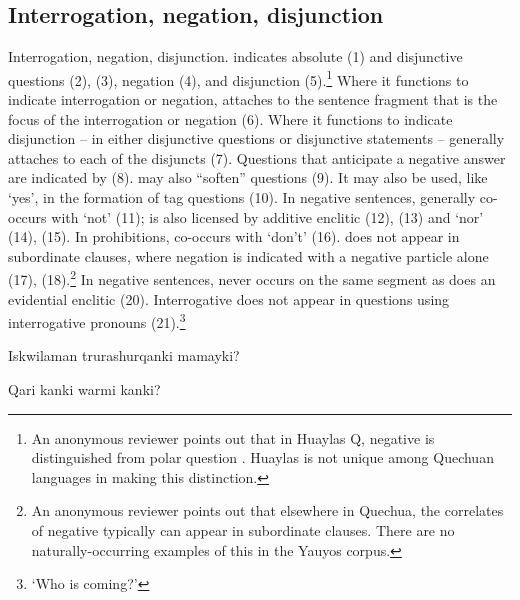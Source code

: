 \subsection{Interrogation, negation, disjunction }\label{ssec:innedi}
Interrogation, negation, disjunction.  indicates absolute (1) and disjunctive questions (2), (3), negation (4), and disjunction (5).\footnote{An anonymous reviewer points out that in Huaylas Q, negative  is distinguished from polar question . Huaylas is not unique among Quechuan languages in making this distinction.} Where it functions to indicate interrogation or negation,  attaches to the sentence fragment that is the focus of the interrogation or negation (6). Where it functions to indicate disjunction -- in either disjunctive questions or disjunctive statements --  generally attaches to each of the disjuncts (7). Questions that anticipate a negative answer are indicated by  (8).  may also ``soften'' questions (9). It may also be used, like  `yes', in the formation of tag questions (10). In negative sentences,  generally co-occurs with  `not' (11);  is also licensed by additive enclitic  (12), (13) and  `nor' (14), (15). In prohibitions,  co-occurs with  `don't' (16).  does not appear in subordinate clauses, where negation is indicated with a negative particle alone (17), (18).\footnote{An anonymous reviewer points out that elsewhere in Quechua, the correlates of negative  typically can appear in subordinate clauses. There are no naturally-occurring examples of this in the Yauyos corpus.} In negative sentences,  never occurs on the same segment as does an evidential enclitic (20). Interrogative  does not appear in questions using interrogative pronouns (21).\footnote{    `Who is coming?'}

%
{\textquestiondown{}Iskwilaman trurashurqanki mamayki?}%
{}%
{}{}%

%
{\textquestiondown{}Qari kanki warmi kanki?}%
{}%
{}{}%

